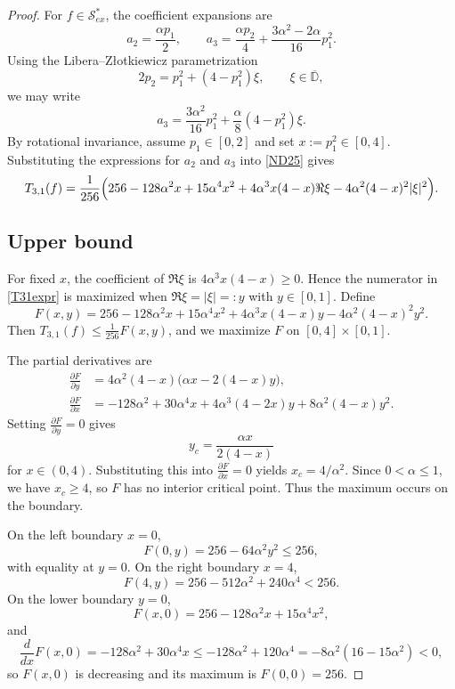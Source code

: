 \documentclass[11pt,reqno]{amsart}
\numberwithin{equation}{section}
\begin{document}
\begin{proof}
For $f\in\mathcal{S}_{ex}^{\ast}$, the coefficient expansions are
\begin{equation}\label{ND28}
a_2=\frac{\alpha p_1}{2},
\qquad
a_3=\frac{\alpha p_2}{4}+\frac{3\alpha^2-2\alpha}{16}p_1^2.
\end{equation}
Using the Libera--Z{\l}otkiewicz parametrization
\[
2p_2=p_1^2+(4-p_1^2)\xi,\qquad \xi\in\overline{\mathbb{D}},
\]
we may write
\[
a_3=\frac{3\alpha^2}{16}p_1^2+\frac{\alpha}{8}(4-p_1^2)\xi.
\]
By rotational invariance, assume $p_1\in[0,2]$ and set $x:=p_1^2\in[0,4]$. Substituting the expressions for $a_2$ and $a_3$ into \eqref{ND25} gives
\begin{equation}\label{T31expr}
T_{3,1}(f)
=
\frac{1}{256}\Bigl(
256-128\alpha^2 x+15\alpha^4 x^2
+4\alpha^3 x(4-x)\Re\xi
-4\alpha^2(4-x)^2|\xi|^2
\Bigr).
\end{equation}

\subsection*{Upper bound}
For fixed $x$, the coefficient of $\Re\xi$ is $4\alpha^3 x(4-x)\ge0$. Hence the numerator in \eqref{T31expr} is maximized when $\Re\xi=|\xi|=:y$ with $y\in[0,1]$. Define
\[
F(x,y)
=
256-128\alpha^2 x+15\alpha^4 x^2
+4\alpha^3 x(4-x)y
-4\alpha^2(4-x)^2 y^2.
\]
Then $T_{3,1}(f)\le\frac1{256}F(x,y)$, and we maximize $F$ on $[0,4]\times[0,1]$.

The partial derivatives are
\begin{align*}
\frac{\partial F}{\partial y}
&=
4\alpha^2(4-x)\bigl(\alpha x-2(4-x)y\bigr),\\
\frac{\partial F}{\partial x}
&=
-128\alpha^2+30\alpha^4 x
+4\alpha^3(4-2x)y
+8\alpha^2(4-x)y^2.
\end{align*}
Setting $\frac{\partial F}{\partial y}=0$ gives
\[
y_c=\frac{\alpha x}{2(4-x)}
\]
for $x\in(0,4)$. Substituting this into $\frac{\partial F}{\partial x}=0$ yields $x_c=4/\alpha^2$. Since $0<\alpha\le1$, we have $x_c\ge4$, so $F$ has no interior critical point. Thus the maximum occurs on the boundary.

On the left boundary $x=0$,
\[
F(0,y)=256-64\alpha^2 y^2\le256,
\]
with equality at $y=0$. On the right boundary $x=4$,
\[
F(4,y)=256-512\alpha^2+240\alpha^4<256.
\]
On the lower boundary $y=0$,
\[
F(x,0)=256-128\alpha^2 x+15\alpha^4 x^2,
\]
and
\[
\frac{d}{dx}F(x,0)
=
-128\alpha^2+30\alpha^4 x
\le
-128\alpha^2+120\alpha^4
=
-8\alpha^2(16-15\alpha^2)<0,
\]
so $F(x,0)$ is decreasing and its maximum is $F(0,0)=256$.


\end{proof}
\end{document}
